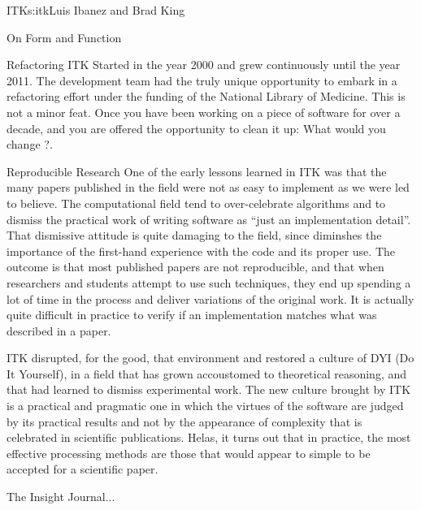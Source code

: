 \begin{aosachapter}{ITK}{s:itk}{Luis Ibanez and Brad King}
\begin{aosasect1}{On Form and Function}
\end{aosasect1}

\begin{aosasect1}{Refactoring}
ITK Started in the year 2000 and grew continuously until the year
2011. The development team had the truly unique opportunity to embark
in a refactoring effort under the funding of the National Library of
Medicine. This is not a minor feat. Once you have been working on a
piece of software for over a decade, and you are offered the
opportunity to clean it up: What would you change ?.
\end{aosasect1}

\begin{aosasect1}{Reproducible Research}
One of the early lessons learned in ITK was that the many papers
published in the field were not as easy to implement as we were led to
believe. The computational field tend to over-celebrate algorithms and
to dismiss the practical work of writing software as ``just an
implementation detail''. That dismissive attitude is quite damaging to
the field, since diminshes the importance of the first-hand experience
with the code and its proper use. The outcome is that most published papers
are not reproducible, and that when researchers and students attempt to use
such techniques, they end up spending a lot of time in the process and deliver
variations of the original work. It is actually quite difficult in practice
to verify if an implementation matches what was described in a paper. 

ITK disrupted, for the good, that environment and restored a culture
of DYI (Do It Yourself), in a field that has grown accoustomed to
theoretical reasoning, and that had learned to dismiss experimental
work. The new culture brought by ITK is a practical and pragmatic one 
in which the virtues of the software are judged by its practical results
and not by the appearance of complexity that is celebrated in scientific
publications. Helas, it turns out that in practice, the most effective 
processing methods are those that would appear to simple to be accepted 
for a scientific paper.

The Insight Journal...
\end{aosasect1}

\end{aosachapter}
